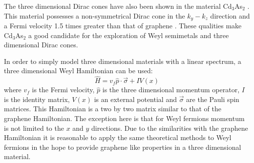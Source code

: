 		The three dimensional Dirac cones have also been shown in the material Cd$_{3}$As$_{2}$ \cite{b34, b35, b36}. This material possesses a non-symmetrical Dirac cone \cite{b34} in the $k_{y}-k_{z}$ direction and a Fermi velocity 1.5 times greater than that of graphene \cite{b35}. These qualities make Cd$_{3}$As$_{2}$ a good candidate for the exploration of Weyl semimetals and three dimensional Dirac cones.

In order to simply model three dimensional materials with a linear spectrum, a three dimensional Weyl Hamiltonian \cite{b50, b51} can be used:
		\begin{equation}
			\hat{H}=v_{f}\hat{p}\cdot\vec{\sigma}+IV(x)
			\label{weyl-ham}
		\end{equation}
		where $v_{f}$ is the Fermi velocity, $\hat{p}$ is the three dimensional momentum operator, $I$ is the identity matrix, $V\left( x\right)$ is an external potential and $\vec{\sigma}$ are the Pauli spin matrices. This Hamiltonian is a two by two matrix similar to that of the graphene Hamiltonian. The exception here is that for Weyl fermions momentum is not limited to the $x$ and $y$ directions. Due to the similarities with the graphene Hamiltonian it is reasonable to apply the same theoretical methods to Weyl fermions in the hope to provide graphene like properties in a three dimensional material.
